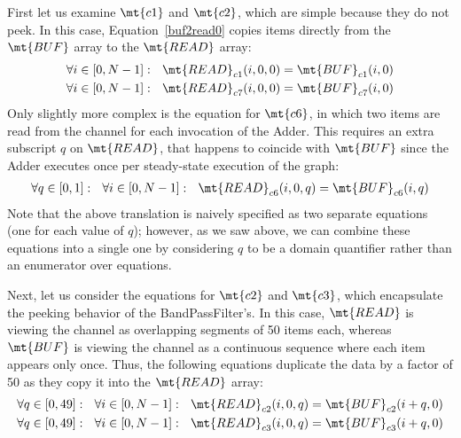First let us examine $\mt{c1}$ and $\mt{c2}$, which are simple because
they do not peek.  In this case, Equation~\ref{buf2read0} copies
items directly from the $\mt{BUF}$ array to the $\mt{READ}$ array:
\begin{align*}
\forall i \in [0,N-1]:~~\mt{READ}_{c1}(i,0,0) = \mt{BUF}_{c1}(i,0) \\
\forall i \in [0,N-1]:~~\mt{READ}_{c7}(i,0,0) = \mt{BUF}_{c7}(i,0)
\end{align*}
Only slightly more complex is the equation for $\mt{c6}$, in which two
items are read from the channel for each invocation of the Adder.
This requires an extra subscript $q$ on $\mt{READ}$, that happens to
coincide with $\mt{BUF}$ since the Adder executes once per
steady-state execution of the graph:
\begin{align*}
\forall q \in [0,1]:~~\forall i \in [0,N-1]:~~\mt{READ}_{c6}(i,0,q) = \mt{BUF}_{c6}(i,q)
\end{align*}
Note that the above translation is naively specified as two separate
equations (one for each value of $q$); however, as we saw above, we
can combine these equations into a single one by considering $q$ to be
a domain quantifier rather than an enumerator over equations.

Next, let us consider the equations for $\mt{c2}$ and $\mt{c3}$, which
encapsulate the peeking behavior of the BandPassFilter's.  In this
case, $\mt{READ}$ is viewing the channel as overlapping segments of 50
items each, whereas $\mt{BUF}$ is viewing the channel as a continuous
sequence where each item appears only once.  Thus, the following
equations duplicate the data by a factor of 50 as they copy it into
the $\mt{READ}$ array:
\begin{align*}
\forall q \in [0,49]:~~\forall i \in [0,N-1]:~~\mt{READ}_{c2}(i,0,q) = \mt{BUF}_{c2}(i+q,0) \\
\forall q \in [0,49]:~~\forall i \in [0,N-1]:~~\mt{READ}_{c3}(i,0,q) = \mt{BUF}_{c3}(i+q,0)
\end{align*}

